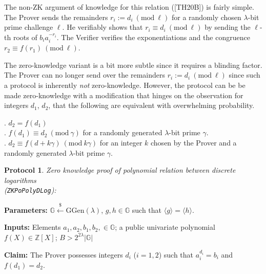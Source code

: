 \documentclass[11pt, lettersize, notitlepage, leqno, footskip=0.6cm]{article}
\newcommand{\bz}{\mathbb Z}
\newcommand{\bG}{\mathbb{G}}
\newcommand{\la}{\langle}
\newcommand{\ra}{\rangle}
\newcommand{\mb}{\mathbb}
\newcommand{\mr}{\mathrm}
\newcommand{\lam}{\lambda}
\newcommand{\lamb}{\lambda}
\newcommand{\noin}{\noindent}
\newcommand{\op}{overwhelming probability}
\newcommand{\Mod}[1]{\ (\mathrm{mod}\ #1)}
\newtheorem{Prot}[Thm]{Protocol}
\numberwithin{equation}{section}
\begin{document}
The non-ZK argument of knowledge for this relation ([TH20B]) is fairly simple. The Prover sends the remainders $r_i:= d_i\Mod{\ell}$ for a randomly chosen $\lam$-bit prime challenge $\ell$. He verifiably shows that $r_i\equiv d_i\Mod{\ell}$ by sending the $\ell$-th roots of $b_ia_i^{-r_i}$. The Verifier verifies the exponentiations and the congruence $r_2\equiv f(r_1)\Mod{\ell}$.

The zero-knowledge variant is a bit more subtle since it requires a blinding factor. The Prover can no longer send over the remainders $r_i:= d_i\Mod{\ell}$ since such a protocol is inherently \textit{not} zero-knowledge. However, the protocol can be be made zero-knowledge with a modification that hinges on the observation for integers $d_1$, $d_2$,  that the following are equivalent with \op.\vspace{0.1cm}

\noin 1. $d_2 = f(d_1)$\\
\noin 2. $f(d_1)\equiv d_2\Mod{\gamma}$ for a randomly generated $\lam$-bit prime $\gamma$.\\
\noin 3. $d_2 \equiv f(d+k\gamma)\Mod{k\gamma} $ for an integer $k$ chosen by the Prover and a randomly generated $\lam$-bit prime $\gamma$. \vspace{0.1cm}



\begin{Prot} \normalfont \hypertarget{Poly}{\textit{Zero knowledge proof of polynomial relation between discrete logarithms}}\\ (\verb|ZKPoPolyDLog|):\end{Prot} \vspace{-0.3cm}

\noin \textbf{Parameters:} $\mb{G}\xleftarrow{\$} \mr{GGen}(\lamb)$,  $g,h\in \mb{G}$ such that $\la g \ra = \la h \ra$.

\noin \textbf{Inputs:} Elements $a_1,a_2, b_1, b_2,  \in \mb{G}$; a public univariate polynomial $f(X)\in \bz[X]$; $B > 2^{2\lam}|\bG|$

\noin \textbf{Claim:} The Prover possesses integers $d_i$ ($i=1,2$) such that $a_i^{d_i} = b_i$ and $f(d_1) = d_2$.
\end{document}
